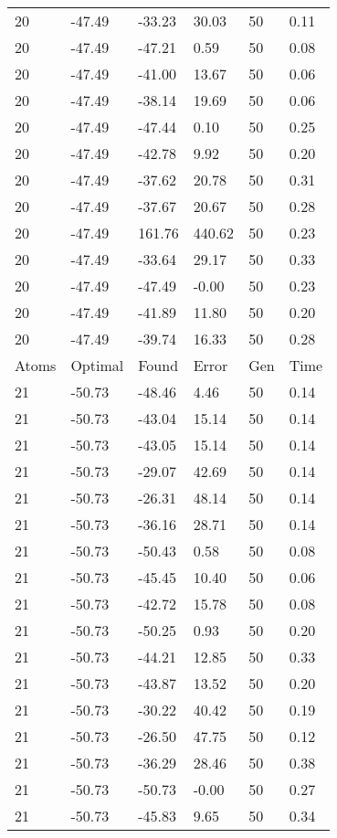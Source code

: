 \documentclass{report}
\begin{document}
\begin{appendix}
\begin{longtable}{llllll}
20 & -47.49 & -33.23 & 30.03 & 50 & 0.11 \\
20 & -47.49 & -47.21 & 0.59 & 50 & 0.08 \\
20 & -47.49 & -41.00 & 13.67 & 50 & 0.06 \\
20 & -47.49 & -38.14 & 19.69 & 50 & 0.06 \\
20 & -47.49 & -47.44 & 0.10 & 50 & 0.25 \\
20 & -47.49 & -42.78 & 9.92 & 50 & 0.20 \\
20 & -47.49 & -37.62 & 20.78 & 50 & 0.31 \\
20 & -47.49 & -37.67 & 20.67 & 50 & 0.28 \\
20 & -47.49 & 161.76 & 440.62 & 50 & 0.23 \\
20 & -47.49 & -33.64 & 29.17 & 50 & 0.33 \\
20 & -47.49 & -47.49 & -0.00 & 50 & 0.23 \\
20 & -47.49 & -41.89 & 11.80 & 50 & 0.20 \\
20 & -47.49 & -39.74 & 16.33 & 50 & 0.28 \\
Atoms & Optimal & Found & Error & Gen & Time \\
21 & -50.73 & -48.46 & 4.46 & 50 & 0.14 \\
21 & -50.73 & -43.04 & 15.14 & 50 & 0.14 \\
21 & -50.73 & -43.05 & 15.14 & 50 & 0.14 \\
21 & -50.73 & -29.07 & 42.69 & 50 & 0.14 \\
21 & -50.73 & -26.31 & 48.14 & 50 & 0.14 \\
21 & -50.73 & -36.16 & 28.71 & 50 & 0.14 \\
21 & -50.73 & -50.43 & 0.58 & 50 & 0.08 \\
21 & -50.73 & -45.45 & 10.40 & 50 & 0.06 \\
21 & -50.73 & -42.72 & 15.78 & 50 & 0.08 \\
21 & -50.73 & -50.25 & 0.93 & 50 & 0.20 \\
21 & -50.73 & -44.21 & 12.85 & 50 & 0.33 \\
21 & -50.73 & -43.87 & 13.52 & 50 & 0.20 \\
21 & -50.73 & -30.22 & 40.42 & 50 & 0.19 \\
21 & -50.73 & -26.50 & 47.75 & 50 & 0.12 \\
21 & -50.73 & -36.29 & 28.46 & 50 & 0.38 \\
21 & -50.73 & -50.73 & -0.00 & 50 & 0.27 \\
21 & -50.73 & -45.83 & 9.65 & 50 & 0.34 \\

\end{longtable}
\end{appendix}
\end{document}
